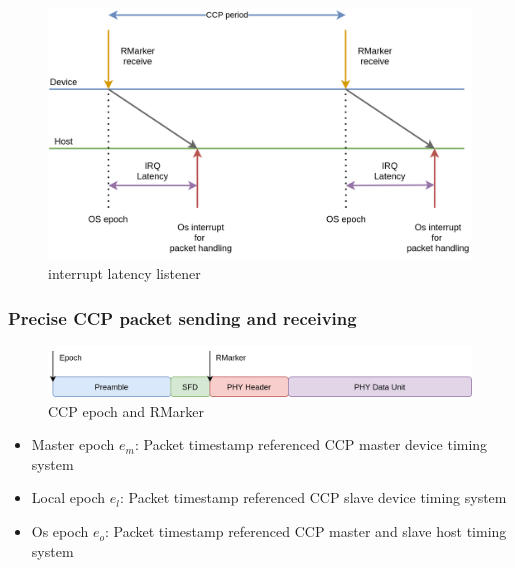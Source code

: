 \documentclass[\main/main.tex]{subfiles}
\begin{document}
\begin{figure}[H]
    \begin{center}
        \includegraphics[scale=0.35]{interupt_latency_listener.png}
    \end{center}
    \caption{interrupt latency listener}
    \label{fig:interupt_latency_listener}
\end{figure}

\subsubsection{Precise CCP packet sending and receiving}
\begin{figure}[H]
    \begin{center}
        \includegraphics[scale=0.35]{ccp_epoch_and_rmarker.png}
    \end{center}
    \caption{CCP epoch and RMarker}
    \label{fig:ccp_epoch_and_rmarker}
\end{figure}

\begin{itemize}
    \item Master epoch $e_m$: Packet timestamp referenced CCP master device timing system
    \item Local epoch $e_l$: Packet timestamp referenced CCP slave device timing system
    \item Os epoch $e_o$: Packet timestamp referenced CCP master and slave host timing system
\end{itemize}
\end{document}
